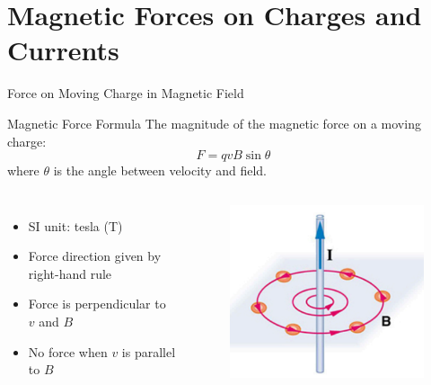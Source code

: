 \documentclass{beamer}
\begin{document}
\section{Magnetic Forces on Charges and Currents}

\begin{frame}{Force on Moving Charge in Magnetic Field}
\begin{block}{Magnetic Force Formula}
The magnitude of the magnetic force on a moving charge:
\begin{equation}
F = qvB\sin\theta
\end{equation}
where $\theta$ is the angle between velocity and field.
\end{block}

\begin{columns}
\begin{itemize}
\item SI unit: tesla (T)
\item Force direction given by right-hand rule
\item Force is perpendicular to $v$ and $B$
\item No force when $v$ is parallel to $B$
\end{itemize}

\begin{figure}
\centering
\includegraphics[width=0.75\linewidth]{mgngd.png}
\end{figure}
\end{columns}
\end{frame}
\end{document}
